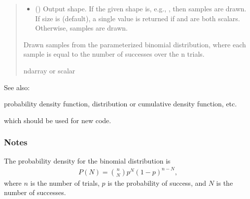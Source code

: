 \documentclass[letterpaper,10pt,english]{sphinxmanual}
\begin{document}
\begin{fulllineitems}
\begin{quote}
\begin{description}
\begin{itemize}
\item {} 
\sphinxAtStartPar
{} (\sphinxstyleliteralemphasis{\sphinxupquote{, }}) \textendash{} Output shape.  If the given shape is, e.g., , then
 samples are drawn.  If size is  (default),
a single value is returned if  and  are both scalars.
Otherwise,  samples are drawn.

\end{itemize}

\sphinxAtStartPar
{} \textendash{} Drawn samples from the parameterized binomial distribution, where
each sample is equal to the number of successes over the n trials.

\sphinxAtStartPar
ndarray or scalar

\end{description}\end{quote}


\begin{sphinxseealso}{See also:}
\begin{description}
\sphinxAtStartPar
probability density function, distribution or cumulative density function, etc.

\sphinxAtStartPar
which should be used for new code.

\end{description}


\end{sphinxseealso}

\subsubsection*{Notes}

\sphinxAtStartPar
The probability density for the binomial distribution is
\begin{equation*}
\begin{split}P(N) = \binom{n}{N}p^N(1-p)^{n-N},\end{split}
\end{equation*}
\sphinxAtStartPar
where \(n\) is the number of trials, \(p\) is the probability
of success, and \(N\) is the number of successes.


\end{fulllineitems}
\end{document}

